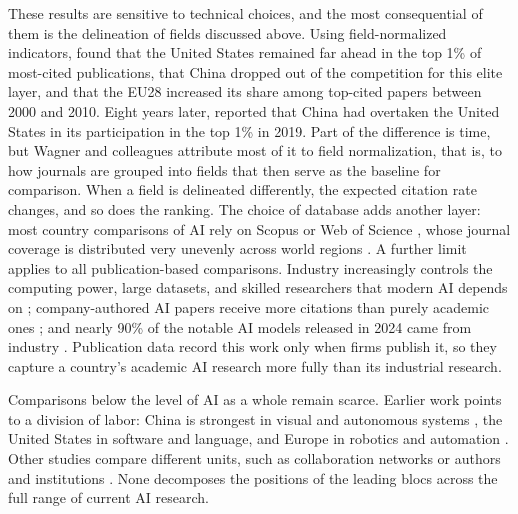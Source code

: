 \documentclass[10pt,twocolumn,a4paper]{article}
\begin{document}
	These results are sensitive to technical choices, and the most consequential of them is the delineation of fields discussed above. Using field-normalized indicators, \textcite{leydesdorff2014european} found that the United States remained far ahead in the top 1\% of most-cited publications, that China dropped out of the competition for this elite layer, and that the EU28 increased its share among top-cited papers between 2000 and 2010. Eight years later, \textcite{wagner2022discussion} reported that China had overtaken the United States in its participation in the top 1\% in 2019. Part of the difference is time, but Wagner and colleagues attribute most of it to field normalization, that is, to how journals are grouped into fields that then serve as the baseline for comparison. When a field is delineated differently, the expected citation rate changes, and so does the ranking. The choice of database adds another layer: most country comparisons of AI rely on Scopus or Web of Science \parencite{hellwig2019ai,almarzouqi2024comparative}, whose journal coverage is distributed very unevenly across world regions \parencite{Maddi2025GeographicalDisciplinaryCoverage}. A further limit applies to all publication-based comparisons. Industry increasingly controls the computing power, large datasets, and skilled researchers that modern AI depends on \parencite{ahmed2023growing}; company-authored AI papers receive more citations than purely academic ones \parencite{farber2024analyzing}; and nearly 90\% of the notable AI models released in 2024 came from industry \parencite{maslej2025artificial}. Publication data record this work only when firms publish it, so they capture a country's academic AI research more fully than its industrial research.
	
	Comparisons below the level of AI as a whole remain scarce. Earlier work points to a division of labor: China is strongest in visual and autonomous systems \parencite{righi2020ai,yu2023discovering}, the United States in software and language, and Europe in robotics and automation \parencite{righi2020ai}. Other studies compare different units, such as collaboration networks \parencite{hu2020global,alshebli2022beijing,cao2020international,vinayak2023signatures} or authors and institutions \parencite{niu2016global,klinger2020narrowing}. None decomposes the positions of the leading blocs across the full range of current AI research.
	
\end{document}
